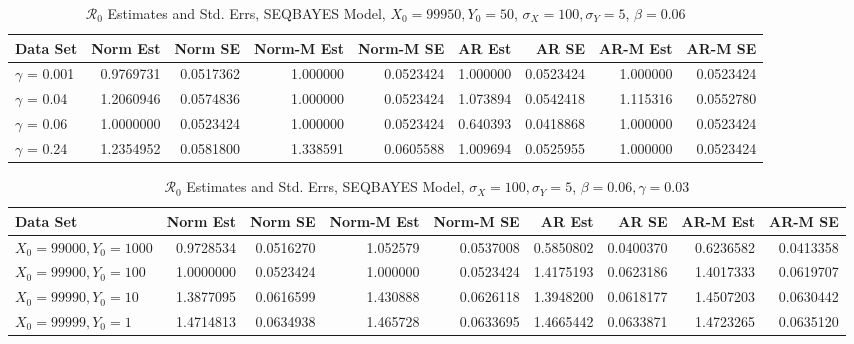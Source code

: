\documentclass[12pt]{article}
\newcommand{\rr}{\ensuremath{\mathcal{R}_0}}
\begin{document}
\begin{table}[H]
	
	\caption{\label{tab:}$\rr$ Estimates and Std. Errs, SEQBAYES Model,
		$X_0 = 99950, Y_0 = 50$, $\sigma_X = 100, \sigma_Y = 5$, $\beta = 0.06$}
	\centering
	\begin{footnotesize}
	\begin{tabular}[t]{l|r|r|r|r|r|r|r|r}
		\hline
		Data Set & Norm Est & Norm SE & Norm-M Est & Norm-M SE & AR Est & AR SE & AR-M Est & AR-M SE\\
		\hline
		$\gamma$ = 0.001 & 0.9769731 & 0.0517362 & 1.000000 & 0.0523424 & 1.000000 & 0.0523424 & 1.000000 & 0.0523424\\
		\hline
		$\gamma$ = 0.04 & 1.2060946 & 0.0574836 & 1.000000 & 0.0523424 & 1.073894 & 0.0542418 & 1.115316 & 0.0552780\\
		\hline
		$\gamma$ = 0.06 & 1.0000000 & 0.0523424 & 1.000000 & 0.0523424 & 0.640393 & 0.0418868 & 1.000000 & 0.0523424\\
		\hline
		$\gamma$ = 0.24 & 1.2354952 & 0.0581800 & 1.338591 & 0.0605588 & 1.009694 & 0.0525955 & 1.000000 & 0.0523424\\
		\hline
	\end{tabular}
\end{footnotesize}
\end{table}


\begin{table}[H]
	
	\caption{\label{tab:}$\rr$ Estimates and Std. Errs, SEQBAYES Model,
		$\sigma_X = 100, \sigma_Y = 5$, $\beta = 0.06, \gamma = 0.03$}
	\centering
	\begin{footnotesize}
		\begin{tabular}[t]{l|r|r|r|r|r|r|r|r}
			\hline
			Data Set & Norm Est & Norm SE & Norm-M Est & Norm-M SE & AR Est & AR SE & AR-M Est & AR-M SE\\
			\hline
			$X_0 = 99000, Y_0 = 1000$ & 0.9728534 & 0.0516270 & 1.052579 & 0.0537008 & 0.5850802 & 0.0400370 & 0.6236582 & 0.0413358\\
			\hline
			$X_0 = 99900, Y_0 = 100$ & 1.0000000 & 0.0523424 & 1.000000 & 0.0523424 & 1.4175193 & 0.0623186 & 1.4017333 & 0.0619707\\
			\hline
			$X_0 = 99990, Y_0 = 10$ & 1.3877095 & 0.0616599 & 1.430888 & 0.0626118 & 1.3948200 & 0.0618177 & 1.4507203 & 0.0630442\\
			\hline
			$X_0 = 99999, Y_0 = 1$ & 1.4714813 & 0.0634938 & 1.465728 & 0.0633695 & 1.4665442 & 0.0633871 & 1.4723265 & 0.0635120\\
			\hline
		\end{tabular}
	\end{footnotesize}
\end{table}
\end{document}
